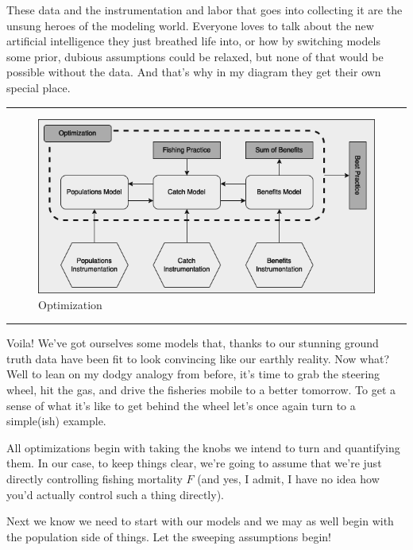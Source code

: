 \documentclass[11pt,a5paper]{book}
\begin{document}
These data and the instrumentation and labor that goes into collecting it are the unsung heroes of the modeling world. Everyone loves to talk about the new artificial intelligence they just breathed life into, or how by switching models some prior, dubious assumptions could be relaxed, but none of that would be possible without the data. And that's why in my diagram they get their own special place.
\newpage

\noindent \rule{\textwidth}{0.5pt} 
\begin{figure}[h!] 
  \includegraphics[width=\linewidth]{drawings/high_level_optimization.png}
  \caption{Optimization}
  \label{fig:high_level_optimization}
\end{figure}
\newline
\rule{\textwidth}{0.5pt} 
\vspace{5pt}

Voila! We've got ourselves some models that, thanks to our stunning ground truth data have been fit to look convincing like our earthly reality. Now what? Well to lean on my dodgy analogy from before, it's time to grab the steering wheel, hit the gas, and drive the fisheries mobile to a better tomorrow. To get a sense of what it's like to get behind the wheel let's once again turn to a simple(ish) example. 
\newline

All optimizations begin with taking the knobs we intend to turn and quantifying them. In our case, to keep things clear, we're going to assume that we're just directly controlling fishing mortality $F$ (and yes, I admit, I have no idea how you'd actually control such a thing directly). 
\newline

Next we know we need to start with our models and we may as well begin with the population side of things. Let the sweeping assumptions begin!
\newline
\end{document}
